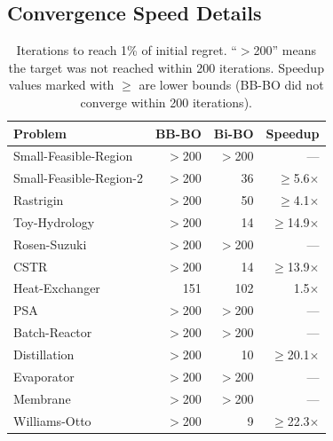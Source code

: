 \documentclass[12pt,a4paper]{article}%
\theoremstyle{plain}%
\theoremstyle{remark}%
\theoremstyle{definition}%
\begin{document}
\begin{appendices}
\section{Convergence Speed Details}\label{sec:convergence_speed_details}

\begin{table}[htbp]
\centering
\caption{Iterations to reach 1\% of initial regret. ``$>$200'' means the target was not reached within 200 iterations. Speedup values marked with $\geq$ are lower bounds (BB-BO did not converge within 200 iterations).}
\label{tab:convergence_speed}
\begin{tabular}{@{}lrrr@{}}
\toprule
\textbf{Problem} & \textbf{BB-BO} & \textbf{Bi-BO} & \textbf{Speedup} \\
\midrule
Small-Feasible-Region   & $>$200 & $>$200 & ---       \\
Small-Feasible-Region-2 & $>$200 & 36     & $\geq$5.6$\times$  \\
Rastrigin               & $>$200 & 50     & $\geq$4.1$\times$  \\
Toy-Hydrology           & $>$200 & 14     & $\geq$14.9$\times$ \\
Rosen-Suzuki            & $>$200 & $>$200 & ---       \\
CSTR                    & $>$200 & 14     & $\geq$13.9$\times$ \\
Heat-Exchanger          & 151    & 102    & 1.5$\times$  \\
PSA                     & $>$200 & $>$200 & ---       \\
Batch-Reactor           & $>$200 & $>$200 & ---       \\
Distillation            & $>$200 & 10     & $\geq$20.1$\times$ \\
Evaporator              & $>$200 & $>$200 & ---       \\
Membrane                & $>$200 & $>$200 & ---       \\
Williams-Otto           & $>$200 & 9      & $\geq$22.3$\times$ \\
\bottomrule
\end{tabular}
\end{table}


\end{appendices}
\end{document}
